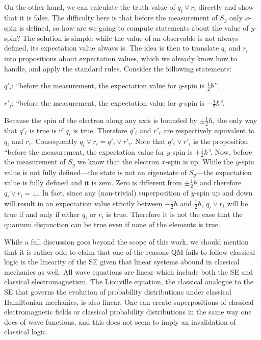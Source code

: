 \documentclass[11pt, executivepaper]{article}
\begin{document}
On the other hand, we can calculate the truth value of $q_i \vee r_i$ directly and show that it is false. The difficulty here is that before the measurement of $S_y$ only $x$-spin is defined, so how are we going to compute statements about the value of $y$-spin? The solution is simple: while the value of an observable is not always defined, its expectation value always is. The idea is then to translate $q_i$ and $r_i$ into propositions about expectation values, which we already know how to handle, and apply the standard rules. Consider the following statements:
\begin{description}
	\item $q'_i$: ``before the measurement, the expectation value for $y$-spin is $\frac{1}{2} \hbar$'',
	\item $r'_i$: ``before the measurement, the expectation value for $y$-spin is $-\frac{1}{2} \hbar$''.
\end{description}
\noindent Because the spin of the electron along any axis is bounded by $\pm \frac{1}{2} \hbar$, the only way that $q'_i$ is true is if $q_i$ is true. Therefore $q'_i$ and $r'_i$ are respectively equivalent to $q_i$ and $r_i$. Consequently $q_i \vee r_i = q'_i \vee r'_i$. Note that $q'_i \vee r'_i$  is the proposition ``before the measurement, the expectation value for $y$-spin is $\pm \frac{1}{2} \hbar$''. Now, before the measurement of $S_y$ we know that the electron $x$-spin is up. While the $y$-spin value is not fully defined---the state is not an eigenstate of $S_y$---the expectation value is fully defined and it is zero. Zero is different from $\pm \frac{1}{2} \hbar$ and therefore $q_i \vee r_i = \bot$. In fact, since any (non-trivial) superposition of $y$-spin up and down will result in an expectation value strictly between $-\frac{1}{2}\hbar$ and $\frac{1}{2}\hbar$, $q_i \vee r_i$ will be true if and only if either $q_i$ or $r_i$ is true. Therefore it is not the case that the quantum disjunction can be true even if none of the elements is true.

While a full discussion goes beyond the scope of this work, we should mention that it is rather odd to claim that one of the reasons QM fails to follow classical logic is the linearity of the SE given that linear systems abound in classical mechanics as well. All wave equations are linear which include both the SE and classical electromagnetism. The Liouville equation, the classical analogue to the SE that governs the evolution of probability distributions under classical Hamiltonian mechanics, is also linear. One can create superpositions of classical electromagnetic fields or classical probability distributions in the same way one does of wave functions, and this does not seem to imply an invalidation of classical logic.
\end{document}
